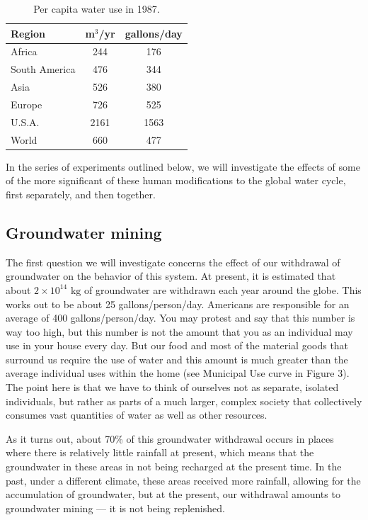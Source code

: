 \documentclass[11pt,letterpaper]{article}
\begin{document}
\begin{table}[h]
\caption{Per capita water use in 1987.\hspace{15cm}}
\begin{tabular}{l c c}\\
\hline
Region & m$^3$/yr & gallons/day\\
\hline
Africa & 244 & 176\\
South America & 476 & 344\\
Asia & 526 & 380\\
Europe & 726 & 525\\
U.S.A. & 2161 & 1563\\
World & 660 & 477\\
\hline
\end{tabular}
\label{table:wateruse}
\end{table}

In the series of experiments outlined below, we will investigate the effects of some of the more significant of these human modifications to the global water cycle, first separately, and then together.

\subsection{Groundwater mining}
The first question we will investigate concerns the effect of our withdrawal of groundwater on the behavior of this system. At present, it is estimated that about $2\times{10}^{14}\mbox{ kg}$ of groundwater are withdrawn each year around the globe. This works out to be about 25 gallons/person/day. Americans are responsible for an average of 400 gallons/person/day. You may protest and say that this number is way too high, but this number is not the amount that you as an individual may use in your house every day. But our food and most of the material goods that surround us require the use of water and this amount is much greater than the average individual uses within the home (see Municipal Use curve in Figure 3). The point here is that we have to think of ourselves not as separate, isolated individuals, but rather as parts of a much larger, complex society that collectively consumes vast quantities of water as well as other resources.

As it turns out, about 70\% of this groundwater withdrawal occurs in places where there is relatively little rainfall at present, which means that the groundwater in these areas in not being recharged at the present time. In the past, under a different climate, these areas received more rainfall, allowing for the accumulation of groundwater, but at the present, our withdrawal amounts to groundwater mining --- it is not being replenished.
\end{document}
